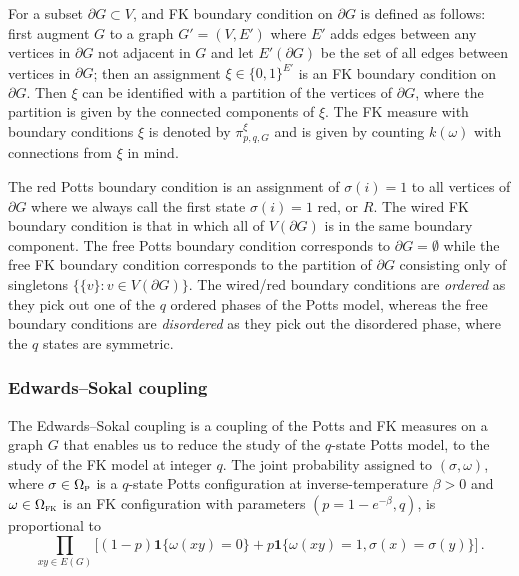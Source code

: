 \documentclass[reqno,11pt]{amsart}
\numberwithin{equation}{section}
\newcommand{\one}{\mathbf{1}}
\theoremstyle{definition}{
\newtheorem{example}[theorem]{Example}
\newtheorem{definition}[theorem]{Definition}
\newtheorem*{definition*}{Definition}
\newtheorem{problem}[theorem]{Problem}
\newtheorem{question}[theorem]{Question}
\newtheorem{remark}[theorem]{Remark}
}
\newcommand{\potts}{{\textsc{p}}}
\newcommand{\rc}{{\textsc{fk}}}
\begin{document}
For a subset $\partial G\subset V$, and FK boundary condition on $\partial G$ is defined as follows: first augment $G$ to a graph $G'= (V, E')$ where $E'$ adds edges between any vertices in $\partial G$ not adjacent in $G$ and let $E'(\partial G)$ be the set of all edges between vertices in $\partial G$; then an assignment $\xi\in \{0,1\}^{E'}$ is an FK boundary condition on $\partial G$. Then $\xi$ can be identified with a partition of the vertices of $\partial G$, where the partition is given by the connected components of $\xi$. The FK measure with boundary conditions $\xi$ is denoted by $\pi^{\xi}_{p,q,G}$ and is given by counting $k(\omega)$ with connections from $\xi$ in mind. 

The red Potts boundary condition is an assignment of $\sigma(i)=1$ to all vertices of $\partial G$ where we always call the first state $\sigma(i)=1$ red, or $R$. The wired FK boundary condition is that in which all of $V(\partial G)$ is in the same boundary component. The free Potts boundary condition corresponds to $\partial G = \emptyset$ while the free FK boundary condition corresponds to the partition of $\partial G$ consisting only of singletons $\{\{v\}:v\in V(\partial G)\}$. The wired/red boundary conditions are \emph{ordered} as they pick out one of the $q$ ordered phases of the Potts model, whereas the free boundary conditions are \emph{disordered} as they pick out the disordered phase, where the $q$ states are symmetric.  

\subsubsection*{Edwards--Sokal coupling}
The Edwards--Sokal coupling \cite{EdSo88} is a coupling of the Potts and FK measures on a graph $G$ that enables us to reduce the study of the $q$-state Potts model, to the study of the FK model at integer $q$.
The joint probability assigned to $(\sigma,\omega)$, where $\sigma\in\Omega_\potts$ is a $q$-state Potts configuration at inverse-temperature $\beta>0$ and $\omega\in\Omega_\rc$ is an FK configuration with parameters $(p=1-e^{-\beta},q)$, is proportional to
\[\prod_{xy\in E(G)}\Big[(1-p)\one\{\omega(xy)=0\} + p\one\{\omega(xy)=1,\sigma(x)=\sigma(y)\}\Big]\,.\]
\end{document}
